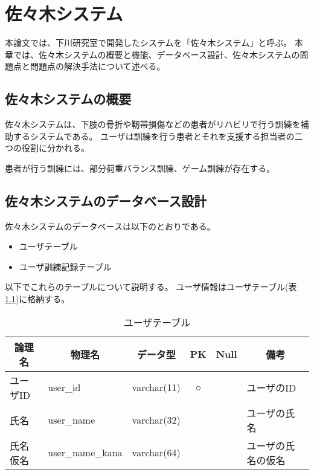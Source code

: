 \documentclass[a4j,12pt,onecolumn,oneside,titlepage,openany,final]{jreport}
\begin{document}

\chapter{佐々木システム}\label{chap:kizon}
本論文では、下川研究室で開発したシステムを「佐々木システム」と呼ぶ。
本章では、佐々木システムの概要と機能、データベース設計、佐々木システムの問題点と問題点の解決手法について述べる。

\section{佐々木システムの概要}\label{sec:kizon_gaiyou}
佐々木システムは、下肢の骨折や靭帯損傷などの患者がリハビリで行う訓練を補助するシステムである。
ユーザは訓練を行う患者とそれを支援する担当者の二つの役割に分かれる。

患者が行う訓練には、部分荷重バランス訓練、ゲーム訓練が存在する。

\section{佐々木システムのデータベース設計}\label{sec:kizon_database}
佐々木システムのデータベースは以下のとおりである。

\begin{itemize}
  \item ユーザテーブル
  \item ユーザ訓練記録テーブル
\end{itemize}

以下でこれらのテーブルについて説明する。
ユーザ情報はユーザテーブル(表\ref{table:user})に格納する。

\begin{table}[htbp]
  \caption{ユーザテーブル}\label{table:user}
  \centering
  \begin{tabular}{|l|l|l|c|c|p{5cm}|}
    \hline
    \multicolumn{1}{|c|}{論理名} & \multicolumn{1}{c|}{物理名} & \multicolumn{1}{c|}{データ型} & PK & Null & \multicolumn{1}{c|}{備考} \\
    \hline
    \hline
    ユーザID & user\_id & varchar(11) & ○ &  & ユーザのID \\
    \hline
    氏名 & user\_name & varchar(32) & & & ユーザの氏名 \\
    \hline
    氏名仮名 & user\_name\_kana & varchar(64) & & & ユーザの氏名の仮名 \\
    \hline
  \end{tabular}
\end{table}
\end{document}
